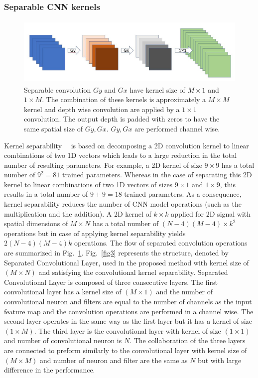 \subsubsection{Separable CNN kernels}
\begin{figure}
\begin{center}
\includegraphics[height=33mm,width=14.0cm]{Figures/fig2.jpg}
\caption{Separable convolution  $Gy$ and $Gx$ have kernel size of $M\times1$ and $1 \times M$. The combination of these kernels is approximately a $M\times M$ kernel  and depth wise convolution are applied by a $1\times1$ convolution. The output depth  is padded with zeros to have the same spatial size of  $Gy, Gx$. $Gy, Gx$ are performed channel wise. }
\label{fig2}\end{center}\end{figure}


    
Kernel separability~\cite{rigamonti2013learning}~\cite{szegedy2017inception} is based on decomposing a 2D convolution kernel to linear combinations of two 1D vectors which leads to a large reduction in  the total number of resulting parameters. For example, a 2D kernel of size $9 \times 9$ has a total number of $9^2 = 81$  trained parameters. Whereas in the case of separating this 2D kernel to  linear combinations of two 1D vectors of sizes $9 \times 1$ and $1 \times 9$, this results in a total number of  $9 + 9 = 18$ trained parameters. As a consequence, kernel separability reduces the number of CNN model operations (such as the multiplication and the addition). A  2D kernel of $k \times k$ applied for 2D signal with spatial dimensions of $ M \times N$ has a total number of  $(N-4)(M-4)\times k^2$ operations but in case of  applying kernel separability  yields $2(N-4)(M-4)k$ operations. The flow of separated convolution operations are summarized in Fig.~\ref{fig2}. Fig.~\ref{fig3} represents the structure, denoted by Separated Convolutional Layer, used in the proposed method with kernel size of $(M\times N)$ and satisfying the convolutional kernel separability. Separated Convolutional Layer is composed of three consecutive layers. The first convolutional layer has a kernel size of $(M\times1)$ and the number of convolutional neuron and  filters are equal to the number of channels as the input feature map and the convolution operations are performed in a channel wise. The second layer  operates in the same way as the first layer but it has a kernel of size $(1\times M)$. The third layer is the convolutional layer with kernel of size $(1\times1)$ and number of convolutional neuron is $N$. The collaboration of the three layers are  connected to preform similarly to the convolutional layer with kernel size of $(M\times M)$ and number of neuron and filter are the same as $N$ but with large difference in the performance.


